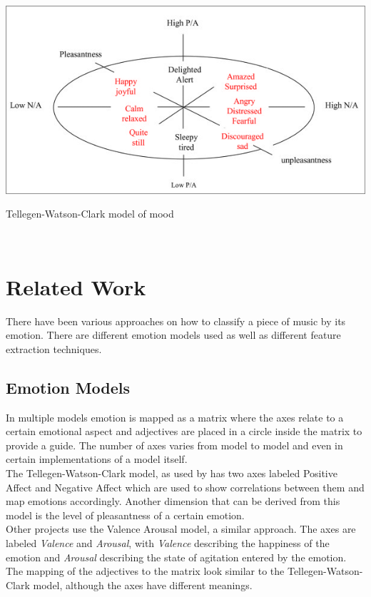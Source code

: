 \documentclass{sigchi-ext}
\begin{document}
\begin{marginfigure}[0pc]
  \begin{minipage}{\marginparwidth}
    \centering
    \includegraphics[width=1.0\marginparwidth]{images/tellegen-watson-clark-model.png}
    \caption{Tellegen-Watson-Clark model of mood \cite{Tellegen1999}}~\label{fig:tellegen-watson-clark}
  \end{minipage}
\end{marginfigure}

\section{Related Work}
There have been various approaches on how to classify a piece of music by its emotion. There are different emotion models used as well as different feature extraction techniques.

\subsection{Emotion Models}
In multiple models emotion is mapped as a matrix where the axes relate to a certain emotional aspect and adjectives are placed in a circle inside the matrix to provide a guide. The number of axes varies from model to model and even in certain implementations of a model itself.\\
The Tellegen-Watson-Clark model, as used by \cite{Trohidis2011} has two axes labeled Positive Affect and Negative Affect which are used to show correlations between them and map emotions accordingly. Another dimension that can be derived from this model is the level of pleasantness of a certain emotion.\\

Other projects use the Valence Arousal model, a similar approach. The axes are labeled \textit{Valence} and \textit{Arousal}, with \textit{Valence} describing the happiness of the emotion and \textit{Arousal} describing the state of agitation entered by the emotion. The mapping of the adjectives to the matrix look similar to the Tellegen-Watson-Clark model, although the axes have different meanings.
\end{document}
